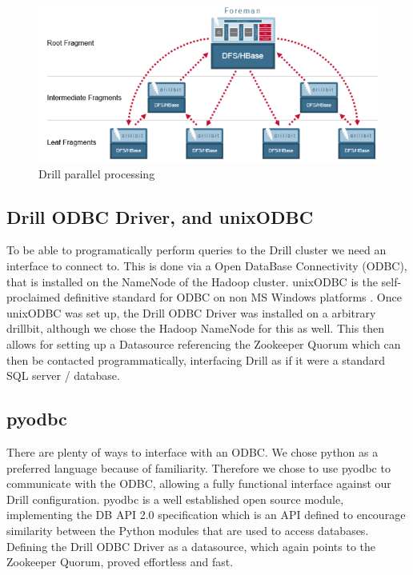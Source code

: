 \documentclass[a4paper,english]{report}
\begin{document}
		\begin{figure}[H]
			\includegraphics[width=\textwidth]{mapr_drill2}
			\caption{Drill parallel processing \cite{mapr_drill}}
		\end{figure}
		
		\subsection{Drill ODBC Driver, and unixODBC}
		To be able to programatically perform queries to the Drill cluster we need an interface to connect to. This is done via a Open DataBase Connectivity (ODBC), that is installed on the NameNode of the Hadoop cluster. unixODBC is the self-proclaimed definitive standard for ODBC on non MS Windows	platforms \cite{unixodbc}. Once unixODBC was set up, the Drill ODBC Driver was installed on a arbitrary drillbit, although we chose the Hadoop NameNode for this as well. This then allows for setting up a Datasource referencing the Zookeeper Quorum which can then be contacted programmatically, interfacing Drill as if it were a standard SQL server / database.
		
		\subsection{pyodbc}
		There are plenty of ways to interface with an ODBC. We chose python as a preferred language because of familiarity. Therefore we chose to use pyodbc \cite{pyodbc} to communicate with the ODBC, allowing a fully functional interface against our Drill configuration. pyodbc is a well established open source module, implementing the DB API 2.0 specification which is an API defined to encourage similarity between the Python modules that are used to access databases. Defining the Drill ODBC Driver as a datasource, which again points to the Zookeeper Quorum, proved effortless and fast.
\end{document}
